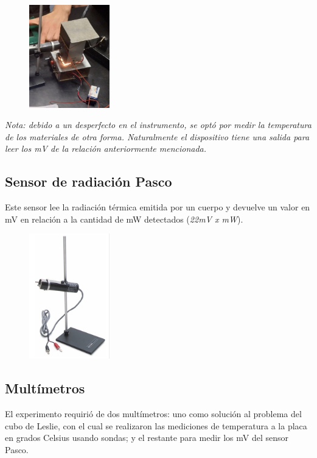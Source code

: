 \documentclass[a4paper]{article}
\begin{document}
			\begin{figure}[h!]
				\centering
				\includegraphics[width =3.5cm]{../imagenes/leslie.jpeg}
			\end{figure}

            \indent \textit{Nota: debido a un desperfecto en el instrumento, se optó por medir la temperatura de los materiales de otra forma. Naturalmente el dispositivo tiene una salida para leer los mV de la relación anteriormente mencionada.}
        \subsection{Sensor de radiación Pasco}
            \indent Este sensor lee la radiación térmica emitida por un cuerpo y devuelve un valor en mV en relación a la cantidad de mW detectados (\textit{22mV x mW}). \\
            
            \begin{figure}[h!]
            	\centering
            	\includegraphics[width =3.5cm]{../imagenes/sensorPasco.png}
            \end{figure}
            	
        \subsection{Multímetros}
            \indent El experimento requirió de dos multímetros: uno como solución al problema del cubo de Leslie, con el cual se realizaron las mediciones de temperatura a la placa en grados Celsius usando sondas; y el restante para medir los mV del sensor Pasco.
            
\end{document}
